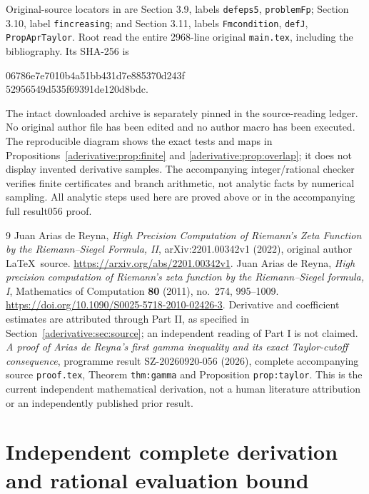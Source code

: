 Original-source locators in \cite{aderivative:AriasII} are
Section 3.9, labels \texttt{defeps5}, \texttt{problemFp};
Section 3.10, label \texttt{fincreasing}; and
Section 3.11, labels \texttt{Fmcondition}, \texttt{defJ},
\texttt{PropAprTaylor}. Root read the entire 2968-line
original \texttt{main.tex}, including the bibliography.
Its SHA-256 is
\begin{center}\small\ttfamily
06786e7e7010b4a51bb431d7e885370d243f\\
52956549d535f69391de120d8bdc.
\end{center}
The intact downloaded archive is separately pinned in the
source-reading ledger. No original author file has been
edited and no author macro has been executed.
The reproducible diagram shows the exact tests and maps
in Propositions~\ref{aderivative:prop:finite} and \ref{aderivative:prop:overlap};
it does not display invented derivative samples.
The accompanying integer/rational checker verifies finite
certificates and branch arithmetic, not analytic facts
by numerical sampling. All analytic steps used here are
proved above or in the accompanying full result056 proof.

\begin{thebibliography}{9}
Juan Arias de Reyna,
\emph{High Precision Computation of Riemann's Zeta Function
by the Riemann--Siegel Formula, II}, arXiv:2201.00342v1
(2022), original author \LaTeX\ source.
\url{https://arxiv.org/abs/2201.00342v1}.
Juan Arias de Reyna,
\emph{High precision computation of Riemann's zeta function
by the Riemann--Siegel formula, I}, Mathematics of
Computation \textbf{80} (2011), no.~274, 995--1009.
\url{https://doi.org/10.1090/S0025-5718-2010-02426-3}.
Derivative and coefficient estimates are attributed
through Part II, as specified in Section~\ref{aderivative:sec:source};
an independent reading of Part I is not claimed.
\emph{A proof of Arias de Reyna's first gamma inequality
and its exact Taylor-cutoff consequence}, programme
result SZ-20260920-056 (2026), complete accompanying
source \texttt{proof.tex}, Theorem \texttt{thm:gamma}
and Proposition \texttt{prop:taylor}. This is the current
independent mathematical derivation, not a human literature
attribution or an independently published prior result.
\end{thebibliography}

\endgroup

\clearpage\begingroup
\part*{Independent complete derivation and rational evaluation bound}
\providecommand{\aindependenttightlist}{\setlength{\itemsep}{0pt}\setlength{\parskip}{0pt}}

